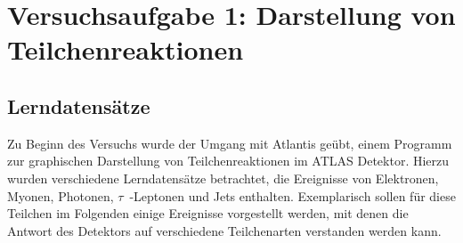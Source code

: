 \documentclass[11pt, a4paper]{article}
\numberwithin{equation}{section}
\begin{document}
\section{Versuchsaufgabe 1: Darstellung von Teilchenreaktionen}

\subsection{Lerndatensätze}

Zu Beginn des Versuchs wurde der Umgang mit Atlantis geübt, einem Programm zur graphischen Darstellung von Teilchenreaktionen im ATLAS Detektor.
Hierzu wurden verschiedene Lerndatensätze betrachtet, die Ereignisse von Elektronen, Myonen, Photonen, $\tau$~-Leptonen und Jets enthalten.
Exemplarisch sollen für diese Teilchen im Folgenden einige Ereignisse vorgestellt werden, mit denen die Antwort des Detektors auf verschiedene Teilchenarten verstanden werden kann.
\end{document}

